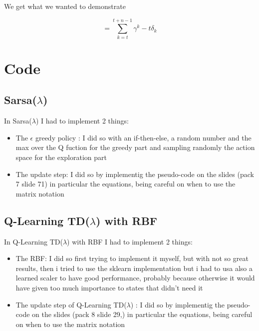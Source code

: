 \documentclass[10pt,a4paper]{article}
\begin{document}
We get what we wanted to demonstrate

\begin{equation*}
    =  \sum_{k = t}^{t+n-1} \gamma^k-t \delta_k  
\end{equation*}

\newpage
\section*{Code}

\subsection*{Sarsa($\lambda$) }
In Sarsa($\lambda$) I had to implement 2 things:
\begin{itemize}
 \item The $\epsilon$ greedy policy :
 I did so with an if-then-else, a random number and
 the max over the Q fuction for the greedy part and sampling randomly the action space
 for the exploration part
 \item The update step: I did so by implementig the pseudo-code on the slides (pack 7 slide 71) in particular
 the equations, being careful on when to use the matrix notation
\end{itemize}

\subsection*{Q-Learning TD($\lambda$) with RBF}
In Q-Learning TD($\lambda$) with RBF I had to implement 2 things:
\begin{itemize}
    \item The RBF:
    I did so first trying to implement it myself, but with not so great results,
    then i tried to use the sklearn implementation but i had to usa also a learned scaler to 
    have good performance, probably because otherwise it would have given too much importance
    to states that didn't need it
    \item The update step of Q-Learning TD($\lambda$)  : I did so by implementig the pseudo-code on the slides (pack 8 slide 29,) in particular
    the equations, being careful on when to use the matrix notation
   \end{itemize}
\end{document}
